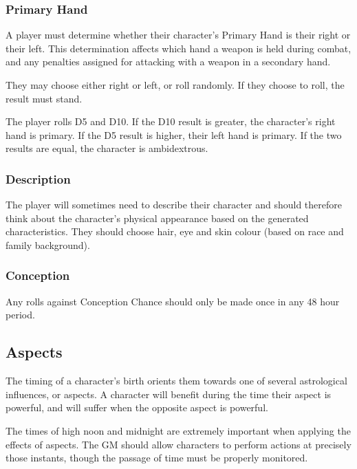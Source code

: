 \begin{multicols*}{3}
\subsubsection{Primary Hand}

A player must determine whether their character's Primary Hand is
their right or their left. This determination affects which hand a
weapon is held during combat, and any penalties assigned for attacking
with a weapon in a secondary hand.

They may choose either right or left, or roll randomly. If they choose
to roll, the result must stand.

The player rolls D5 and D10. If the D10 result is greater, the
character's right hand is primary. If the D5 result is higher, their
left hand is primary. If the two results are equal, the character is
ambidextrous.

\subsubsection{Description}
\label{chargen:description}

The player will sometimes need to describe their character and should
therefore think about the character's physical appearance based on the
generated characteristics. They should choose hair, eye and skin
colour (based on race and family background).

\subsubsection{Conception}

Any rolls against Conception Chance should only be made once in any 48
hour period.


\subsection{Aspects}
\label{chargen:aspect}

The timing of a character's birth orients them towards one of several
astrological influences, or aspects. A character will benefit during
the time their aspect is powerful, and will suffer when the opposite
aspect is powerful.

The times of high noon and midnight are extremely important when
applying the effects of aspects. The GM should allow characters to
perform actions at precisely those instants, though the passage of
time must be properly monitored.


\end{multicols*}
